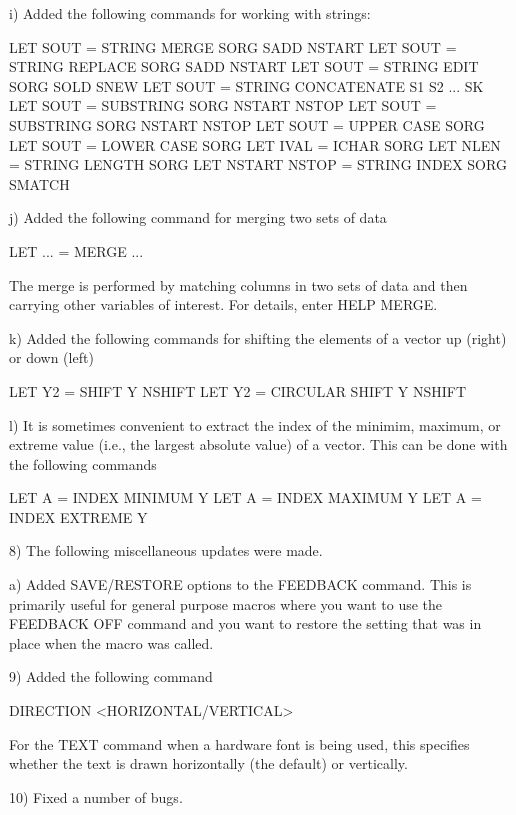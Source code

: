 {    i) Added the following commands for working with strings:

          LET SOUT = STRING MERGE          SORG  SADD  NSTART
          LET SOUT = STRING REPLACE        SORG  SADD  NSTART
          LET SOUT = STRING EDIT           SORG  SOLD  SNEW
          LET SOUT = STRING CONCATENATE    S1 S2 ...  SK
          LET SOUT = SUBSTRING             SORG  NSTART NSTOP
          LET SOUT = SUBSTRING             SORG  NSTART NSTOP
          LET SOUT = UPPER CASE            SORG
          LET SOUT = LOWER CASE            SORG
          LET IVAL = ICHAR                 SORG
          LET NLEN = STRING LENGTH         SORG
          LET NSTART NSTOP = STRING INDEX  SORG  SMATCH

    j) Added the following command for merging two sets of data

          LET ... = MERGE ...

       The merge is performed by matching columns in two sets of
       data and then carrying other variables of interest.  For
       details, enter HELP MERGE.

    k) Added the following commands for shifting the elements of
       a vector up (right) or down (left)

           LET Y2 = SHIFT Y NSHIFT
           LET Y2 = CIRCULAR SHIFT Y NSHIFT

    l) It is sometimes convenient to extract the index of the
       minimim, maximum, or extreme value (i.e., the largest
       absolute value) of a vector.  This can be done with the
       following commands

           LET A = INDEX MINIMUM Y
           LET A = INDEX MAXIMUM Y
           LET A = INDEX EXTREME Y

 8) The following miscellaneous updates were made.

    a) Added SAVE/RESTORE options to the FEEDBACK command.
       This is primarily useful for general purpose macros
       where you want to use the FEEDBACK OFF command and
       you want to restore the setting that was in place
       when the macro was called.

 9) Added the following command

       DIRECTION <HORIZONTAL/VERTICAL>

    For the TEXT command when a hardware font is being used,
    this specifies whether the text is drawn horizontally
    (the default) or vertically.

10) Fixed a number of bugs.

}
